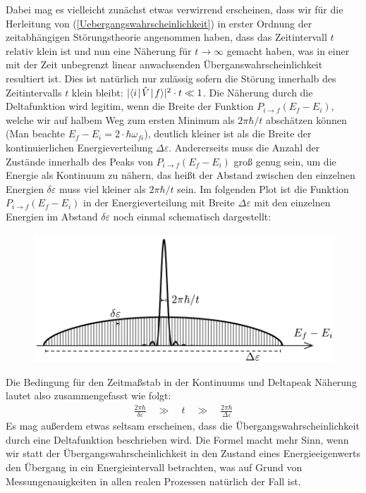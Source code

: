 Dabei mag es vielleicht zunächst etwas verwirrend erscheinen, dass wir für die Herleitung von (\ref{Uebergangswahrscheinlichkeit}) in erster Ordnung der zeitabhängigen Störungstheorie angenommen haben, dass das Zeitintervall $t$ relativ klein ist und nun eine Näherung für $t\to\infty$ gemacht haben, was in einer mit der Zeit unbegrenzt linear anwachsenden Überganswahrscheinlichkeit resultiert ist. Dies ist natürlich nur zulässig sofern die Störung innerhalb des Zeitintervalls $t$ klein bleibt: $|\bracket{i}{\hat{V}}{f}|^2\cdot t\ll1$. Die Näherung durch die Deltafunktion wird legitim, wenn die Breite der Funktion $P_{i\to f}(E_f-E_i)$, welche wir auf halbem Weg zum ersten Minimum als $2\pi\hbar/t$ abschätzen können (Man beachte $E_f-E_i=2\cdot\hbar\omega_{fi}$), deutlich kleiner ist als die Breite der kontinuierlichen Energieverteilung $\Delta\varepsilon$. Andererseits muss die Anzahl der Zustände innerhalb des Peaks von $P_{i\to f}(E_f-E_i)$ groß genug sein, um die Energie als Kontinuum zu nähern, das heißt der Abstand zwischen den einzelnen Energien $\delta\varepsilon$ muss viel kleiner als $2\pi\hbar/t$ sein. Im folgenden Plot ist die Funktion $P_{i\to f}(E_f-E_i)$ in der Energieverteilung mit Breite $\Delta\varepsilon$ mit den einzelnen Energien im Abstand $\delta\varepsilon$ noch einmal schematisch dargestellt: 
\vspace{-2ex}\begin{figure}[!h]\center
	\includegraphics[scale=.75]{Figs/Escale}
\end{figure}\vspace{-4ex} 

Die Bedingung für den Zeitmaßstab in der Kontinuums und Deltapeak Näherung lautet also zusammengefasst wie folgt: 
\begin{eqnarray*}
	\frac{2 \pi \hbar}{\delta\varepsilon} \quad\gg\quad t \quad\gg\quad \frac{2\pi \hbar}{\Delta\varepsilon}
\end{eqnarray*}
Es mag außerdem etwas seltsam erscheinen, dass die Übergangswahrscheinlichkeit durch eine Deltafunktion beschrieben wird. Die Formel macht mehr Sinn, wenn wir statt der Übergangswahrscheinlichkeit in den Zustand eines Energieeigenwerts den Übergang in ein Energieintervall betrachten, was auf Grund von Messungenauigkeiten in allen realen Prozessen natürlich der Fall ist. 

